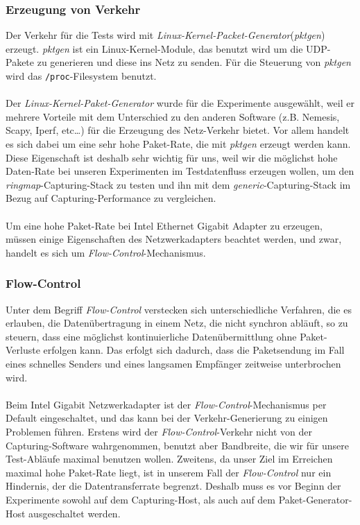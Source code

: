 \subsubsection{Erzeugung von Verkehr}
Der Verkehr für die Tests wird mit
\emph{Linux-Kernel-Packet-Generator}(\emph{pktgen})~\cite{linux_pktgen} erzeugt.
\emph{pktgen} ist ein Linux-Kernel-Module, das benutzt wird um die UDP-Pakete
zu generieren und diese ins Netz zu senden. Für die Steuerung von \emph{pktgen}
wird das \verb+/proc+-Filesystem benutzt.\\\\
Der \emph{Linux-Kernel-Paket-Generator} wurde für die Experimente ausgewählt,
weil er mehrere Vorteile mit dem Unterschied zu den anderen Software (z.B.
Nemesis, Scapy, Iperf, etc\ldots) für die Erzeugung des Netz-Verkehr bietet. Vor
allem handelt es sich dabei um eine sehr hohe Paket-Rate, die mit \emph{pktgen}
erzeugt werden kann. Diese Eigenschaft ist deshalb sehr wichtig für uns, weil
wir die möglichst hohe Daten-Rate bei unseren Experimenten im Testdatenfluss
erzeugen wollen, um den \emph{ringmap}-Capturing-Stack zu testen und ihn mit
dem \emph{generic}-Capturing-Stack im Bezug auf Capturing-Performance zu
vergleichen. \\\\
%
Um eine hohe Paket-Rate bei Intel Ethernet Gigabit Adapter zu erzeugen, müssen
einige Eigenschaften des Netzwerkadapters beachtet werden, und zwar,
handelt es sich um \emph{Flow-Control}-Mechanismus.
%
\subsubsection*{Flow-Control}
Unter dem Begriff \emph{Flow-Control} verstecken sich unterschiedliche 
Verfahren, die es erlauben, die Datenübertragung in einem Netz, die nicht synchron 
abläuft, so zu steuern, dass eine möglichst kontinuierliche Datenübermittlung ohne 
Paket-Verluste erfolgen kann. Das erfolgt sich dadurch, dass die Paketsendung 
im Fall eines schnelles Senders und eines langsamen Empfänger zeitweise unterbrochen 
wird.\\\\
%
Beim Intel Gigabit Netzwerkadapter ist der \emph{Flow-Control}-Mechanismus per Default
eingeschaltet, und das kann  bei der Verkehr-Generierung zu einigen  Problemen
führen. Erstens wird der \emph{Flow-Control}-Verkehr nicht von der
Capturing-Software wahrgenommen, benutzt aber Bandbreite, die wir für unsere
Test-Abläufe maximal benutzen wollen.  Zweitens, da unser Ziel im Erreichen
maximal hohe Paket-Rate liegt, ist in unserem Fall der \emph{Flow-Control} nur ein
Hindernis, der die Datentransferrate begrenzt. Deshalb muss es vor Beginn der
Experimente sowohl auf dem Capturing-Host, als auch auf dem
Paket-Generator-Host ausgeschaltet werden.
%
